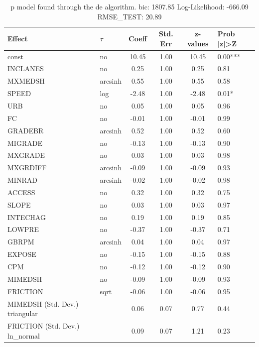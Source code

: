 \begin{table}
	\caption{p model found through the de algorithm. bic: 1807.85 Log-Likelihood: -666.09 RMSE_TEST: 20.89}
	\begin{center}
		\begin{tabular}{|l|l|c|c|c|l|}
			\hline
			Effect & $\tau$ & Coeff & Std. Err & z-values & Prob |z|>Z \\
			\hline
			const & no & 10.45 & 1.00 & 10.45 & 0.00*** \\
			\hline
			INCLANES & no & 0.25 & 1.00 & 0.25 & 0.81 \\
			\hline
			MXMEDSH & arcsinh & 0.55 & 1.00 & 0.55 & 0.58 \\
			\hline
			SPEED & log & -2.48 & 1.00 & -2.48 & 0.01* \\
			\hline
			URB & no & 0.05 & 1.00 & 0.05 & 0.96 \\
			\hline
			FC & no & -0.01 & 1.00 & -0.01 & 0.99 \\
			\hline
			GRADEBR & arcsinh & 0.52 & 1.00 & 0.52 & 0.60 \\
			\hline
			MIGRADE & no & -0.13 & 1.00 & -0.13 & 0.90 \\
			\hline
			MXGRADE & no & 0.03 & 1.00 & 0.03 & 0.98 \\
			\hline
			MXGRDIFF & arcsinh & -0.09 & 1.00 & -0.09 & 0.93 \\
			\hline
			MINRAD & arcsinh & -0.02 & 1.00 & -0.02 & 0.98 \\
			\hline
			ACCESS & no & 0.32 & 1.00 & 0.32 & 0.75 \\
			\hline
			SLOPE & no & 0.03 & 1.00 & 0.03 & 0.97 \\
			\hline
			INTECHAG & no & 0.19 & 1.00 & 0.19 & 0.85 \\
			\hline
			LOWPRE & no & -0.37 & 1.00 & -0.37 & 0.71 \\
			\hline
			GBRPM & arcsinh & 0.04 & 1.00 & 0.04 & 0.97 \\
			\hline
			EXPOSE & no & -0.15 & 1.00 & -0.15 & 0.88 \\
			\hline
			CPM & no & -0.12 & 1.00 & -0.12 & 0.90 \\
			\hline
			MIMEDSH & no & -0.09 & 1.00 & -0.09 & 0.93 \\
			\hline
			FRICTION & sqrt & -0.06 & 1.00 & -0.06 & 0.95 \\
			\hline
			MIMEDSH (Std. Dev.) triangular &  & 0.06 & 0.07 & 0.77 & 0.44 \\
			\hline
			FRICTION (Std. Dev.) ln_normal &  & 0.09 & 0.07 & 1.21 & 0.23 \\
			\hline
		\end{tabular}
	\end{center}
\end{table}